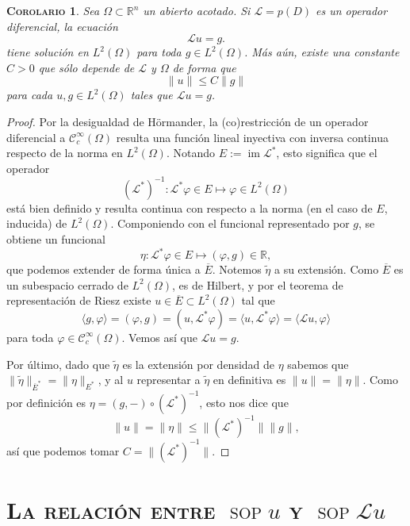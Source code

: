 \documentclass[11pt]{article}
\theoremstyle{colored}
\DeclareMathOperator{\sop}{sop}
\newtheorem{corollary}{\scshape Corolario}
\newcommand{\R}{\mathbb{R}}
\newcommand{\C}{\mathscr{C}}
\newcommand{\im}{\operatorname{im}}
\newcommand{\ev}[1]{\langle #1 \rangle}
\newcommand{\ip}[1]{( #1 )}
\renewcommand{\L}{\mathscr{L}}
\begin{document}
\begin{corollary} \label{sol-l2}Sea $\Omega \subset \R^n$ un abierto acotado. Si $\L = p(D)$ es un operador diferencial, la ecuación 
\[
\L u = g.
\]
tiene solución en $L^2(\Omega)$ para toda $g \in L^2(\Omega)$. Más aún, existe una constante $C > 0$ que sólo depende de $\L$ y $\Omega$ de forma que
\[
\|u\| \leq C \|g\|
\]
para cada $u,g \in L^2(\Omega)$ tales que $\L u = g$.
\end{corollary}
\begin{proof} Por la desigualdad de Hörmander, la (co)restricción de un operador diferencial a $\C_c^\infty(\Omega)$ resulta una función lineal inyectiva con inversa continua respecto de la norma en $L^2(\Omega)$. Notando $E := \im \L^\ast$, esto significa que el operador
\[
(\L^\ast)^{-1} : \L^\ast \varphi \in E \mapsto \varphi \in L^2(\Omega)
\]
está bien definido y resulta continua con respecto a la norma (en el caso de $E$, inducida) de $L^2(\Omega)$. Componiendo con el funcional representado por $g$, se obtiene un funcional
\[
\eta  : \L^\ast\varphi \in E \mapsto \ip{\varphi, g} \in \R,
\]
que podemos extender de forma única a $\overline{E}$. Notemos $\widetilde{\eta}$ a su extensión. Como $\overline{E}$ es un subespacio cerrado de $L^2(\Omega)$, es de Hilbert, y por el teorema de representación de Riesz existe $u \in \overline{E} \subset L^2(\Omega)$ tal que
\[
\ev{g,\varphi} = (\varphi,g) = (u,\L^\ast\varphi) = \ev{u,\L^\ast\varphi} = \ev{\L u, \varphi}
\]
para toda $\varphi \in \C_c^\infty(\Omega)$. Vemos así que $\L u = g$. 

Por último, dado que $\widetilde{\eta}$ es la extensión por densidad de $\eta$ sabemos que $\|\widetilde{\eta}\|_{\overline{E}^\ast} = \|\eta\|_{E^\ast}$, y al $u$ representar a $\widetilde{\eta}$ en definitiva es $\|u\| = \|\eta\|$. Como por definición es $\eta = (g,-) \circ (\L^\ast)^{-1}$, esto nos dice que
\[
\|u\| = \|\eta\| \leq \|(\L^\ast)^{-1}\| \|g\|,
\]
así que podemos tomar $C = \|(\L^\ast)^{-1}\|$.
\end{proof}

\section{\scshape La relación entre $\sop u$ y $\sop \L u$}
\end{document}
